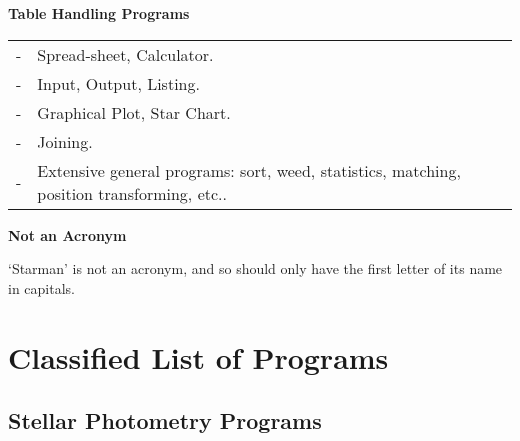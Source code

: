 {\vspace*{1mm} \large \bf Table Handling Programs \vspace*{-1mm} }
 
\hspace*{3ex} \begin{tabular}{lp{5.5in}}
- & Spread-sheet, Calculator. \\
- & Input, Output, Listing. \\
- & Graphical Plot, Star Chart. \\
- & Joining. \\
- & Extensive general programs: sort, weed, statistics,
    matching, position transforming, etc.. \\
\end{tabular}
 
 
{\vspace*{1mm} \large \bf Not an Acronym \vspace*{-1mm} }
 
\vspace*{0.2mm}
`Starman' is not an acronym, and so should only have the first letter of
its name in capitals.
 
 
\newpage
 
\phantom{aa}
 
\newpage
 
\tableofcontents
\setlength{\parskip}{\medskipamount}
\markright{\stardocname}
 
\newpage
 
\section{Classified List of Programs}
\label{se:class}
 
\subsection{Stellar Photometry Programs}
 
